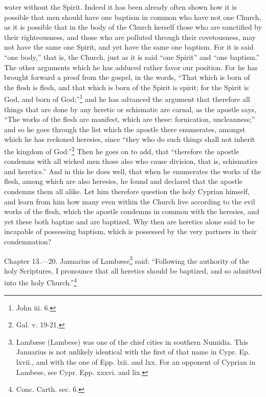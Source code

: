 water without the Spirit. Indeed it has been already often shown how it is possible that men should have one baptism in common who have not one Church, as it is possible that in the body of the Church herself those who are sanctified by their righteousness, and those who are polluted through their covetousness, may not have the same one Spirit, and yet have the same one baptism. For it is said ``one body,'' that is, the Church, just as it is said ``one Spirit'' and ``one baptism.'' The other arguments which he has adduced rather favor our position. For he has brought forward a proof from the gospel, in the words, ``That which is born of the flesh is flesh, and that which is born of the Spirit is spirit; for the Spirit is God, and born of God;''\footnote{\par  John iii. 6.} and he has advanced the argument that therefore all things that are done by any heretic or schismatic are carnal, as the apostle says, ``The works of the flesh are manifest, which are these: fornication, uncleanness;'' and so he goes through the list which the apostle there enumerates, amongst which he has reckoned heresies, since ``they who do such things shall not inherit the kingdom of God.''\footnote{\par  Gal. v. 19-21.} Then he goes on to add, that ``therefore the apostle condemns with all wicked men those also who cause division, that is, schismatics and heretics.'' And in this he does well, that when he enumerates the works of the flesh, among which are also heresies, he found and declared that the apostle condemns them all alike. Let him therefore question the holy Cyprian himself, and learn from him how many even within the Church live according to the evil works of the flesh, which the apostle condemns in common with the heresies, and yet these both baptize and are baptized. Why then are heretics alone said to be incapable of possessing baptism, which is possessed by the very partners in their condemnation?


Chapter 13.—20. Januarius of Lambæse\footnote{\par  Lambæse (Lambese) was one of the chief cities in southern Numidia. This Januarius is not unlikely identical with the first of that name in Cypr. Ep. lxvii., and with the one of Epp. lxii. and lxx. For an opponent of Cyprian in Lambese, see Cypr. Epp. xxxvi. and lix.} said: ``Following the authority of the holy Scriptures, I pronounce that all heretics should be baptized, and so admitted into the holy Church.''\footnote{\par  Conc. Carth. sec. 6.}

